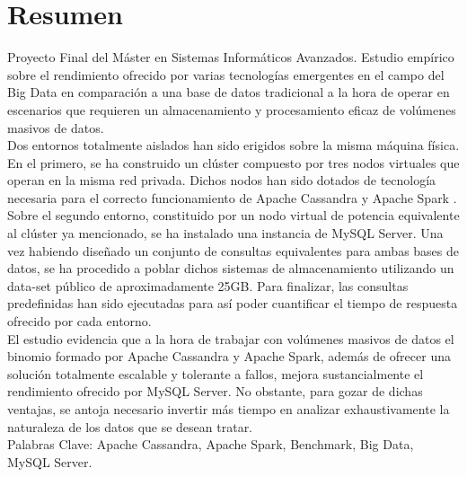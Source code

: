 \section*{Resumen}

Proyecto Final del Máster en Sistemas Informáticos Avanzados. Estudio empírico sobre el rendimiento ofrecido por varias tecnologías emergentes en el campo del Big Data en comparación a una base de datos tradicional a la hora de operar en escenarios que requieren un almacenamiento y procesamiento eficaz de volúmenes masivos de datos.\\

Dos entornos totalmente aislados han sido erigidos sobre la misma máquina física. En el primero, se ha construido un clúster compuesto por tres nodos virtuales que operan en la misma red privada. Dichos nodos han sido dotados de tecnología necesaria para el correcto funcionamiento de Apache Cassandra \cite{lakshman2010cassandra} y Apache Spark \cite{zaharia2010spark}. Sobre el segundo entorno, constituido por un nodo virtual de potencia equivalente al clúster ya mencionado, se ha instalado una instancia de MySQL Server. Una vez habiendo diseñado un conjunto de consultas equivalentes para ambas bases de datos, se ha procedido a poblar dichos sistemas de almacenamiento utilizando un data-set público de aproximadamente 25GB. Para finalizar, las consultas predefinidas han sido ejecutadas para así poder cuantificar el tiempo de respuesta ofrecido por cada entorno.\\

El estudio evidencia que a la hora de trabajar con volúmenes masivos de datos el binomio formado por Apache Cassandra y Apache Spark, además de ofrecer una solución totalmente escalable y tolerante a fallos, mejora sustancialmente el rendimiento ofrecido por MySQL Server. No obstante, para gozar de dichas ventajas, se antoja necesario invertir más tiempo en analizar exhaustivamente la naturaleza de los datos que se desean tratar.\\


Palabras Clave: Apache Cassandra, Apache Spark, Benchmark, Big Data, MySQL Server.\\
